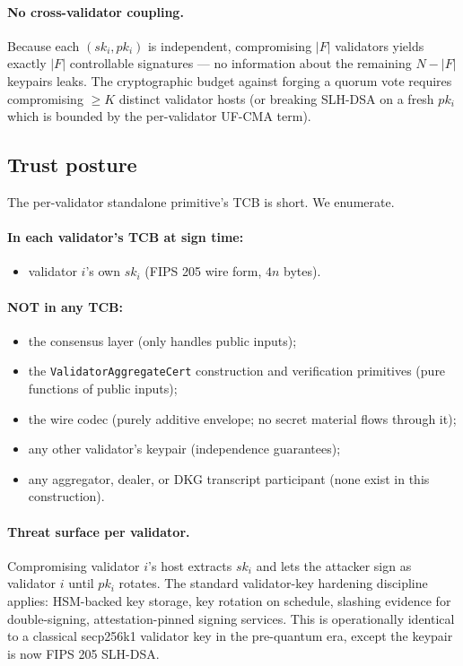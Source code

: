 \paragraph{No cross-validator coupling.} Because each
$(sk_i, pk_i)$ is independent, compromising $|F|$ validators
yields exactly $|F|$ controllable signatures --- no information
about the remaining $N - |F|$ keypairs leaks. The cryptographic
budget against forging a quorum vote requires compromising
$\ge K$ distinct validator hosts (or breaking SLH-DSA on a fresh
$pk_i$ which is bounded by the per-validator UF-CMA term).

\subsection{Trust posture}
\label{sec:security:tcb}

The per-validator standalone primitive's TCB is short. We enumerate.

\paragraph{In each validator's TCB at sign time:}
\begin{itemize}[leftmargin=2em,nosep]
  \item validator $i$'s own $sk_i$ (FIPS 205 wire form,
        $4n$ bytes).
\end{itemize}

\paragraph{NOT in any TCB:}
\begin{itemize}[leftmargin=2em,nosep]
  \item the consensus layer (only handles public inputs);
  \item the \texttt{ValidatorAggregateCert} construction and
        verification primitives (pure functions of public
        inputs);
  \item the wire codec (purely additive envelope; no secret
        material flows through it);
  \item any other validator's keypair (independence guarantees);
  \item any aggregator, dealer, or DKG transcript participant
        (none exist in this construction).
\end{itemize}

\paragraph{Threat surface per validator.} Compromising
validator $i$'s host extracts $sk_i$ and lets the attacker sign
as validator $i$ until $pk_i$ rotates. The standard validator-key
hardening discipline applies: HSM-backed key storage, key rotation
on schedule, slashing evidence for double-signing,
attestation-pinned signing services. This is operationally
identical to a classical secp256k1 validator key in the
pre-quantum era, except the keypair is now FIPS 205 SLH-DSA.

